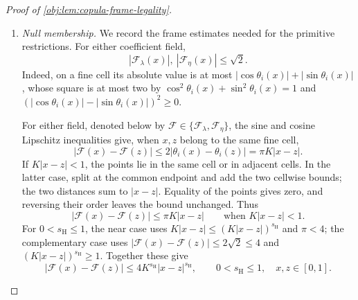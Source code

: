 \documentclass[11pt]{article}
\begin{document}
\begin{proof}[Proof of \cref{obj:lem:copula-frame-legality}]
\begin{enumerate}
Summing the signed marked outcomes within each arm also gives
\[
\begin{aligned}
e_P(x)&=\frac{1+\xi(x)}2,\\
m_{0,P}(x)
&=\varepsilon L\frac{\upsilon(x)-\zeta(x)}{1-\xi(x)}
 =\varepsilon L\{\upsilon(x)-t_\nu(x)(1+\xi(x))\},\\
m_{1,P}(x)
&=\varepsilon L\frac{\upsilon(x)+\zeta(x)}{1+\xi(x)}
 =\varepsilon L\{\upsilon(x)+t_\nu(x)(1-\xi(x))\},\\
\tau_P(x)&=2\varepsilon L t_\nu(x).
\end{aligned}
\]
All denominators are positive because \(|\xi(x)|\le1/8\).

\item \textit{Null membership.}
We record the frame estimates needed for the primitive restrictions. For either coefficient field,
\[
|\mathcal F_\lambda(x)|,\ |\mathcal F_\eta(x)|
\le\sqrt2.
\]
Indeed, on a fine cell its absolute value is at most
\(|\cos\theta_i(x)|+|\sin\theta_i(x)|\), whose square is at most two by
\(\cos^2\theta_i(x)+\sin^2\theta_i(x)=1\) and
\((|\cos\theta_i(x)|-|\sin\theta_i(x)|)^2\ge0\).

For either field, denoted below by
\(\mathcal F\in\{\mathcal F_\lambda,\mathcal F_\eta\}\), the sine and cosine Lipschitz inequalities give, when \(x,z\) belong to the same fine cell,
\[
|\mathcal F(x)-\mathcal F(z)|
\le2|\theta_i(x)-\theta_i(z)|
=\pi K|x-z|.
\]
If \(K|x-z|<1\), the points lie in the same cell or in adjacent cells. In the latter case, split at the common endpoint and add the two cellwise bounds; the two distances sum to \(|x-z|\). Equality of the points gives zero, and reversing their order leaves the bound unchanged. Thus
\[
|\mathcal F(x)-\mathcal F(z)|
\le\pi K|x-z|
\qquad\text{when }K|x-z|<1.
\]
For \(0<s_{\mathrm H}\le1\), the near case uses
\(K|x-z|\le(K|x-z|)^{s_{\mathrm H}}\) and \(\pi<4\); the complementary case uses
\(|\mathcal F(x)-\mathcal F(z)|\le2\sqrt2\le4\) and
\((K|x-z|)^{s_{\mathrm H}}\ge1\). Together these give
\[
|\mathcal F(x)-\mathcal F(z)|
\le4K^{s_{\mathrm H}}|x-z|^{s_{\mathrm H}},
\qquad
0<s_{\mathrm H}\le1,\quad x,z\in[0,1].
\]


\end{enumerate}
\end{proof}
\end{document}
